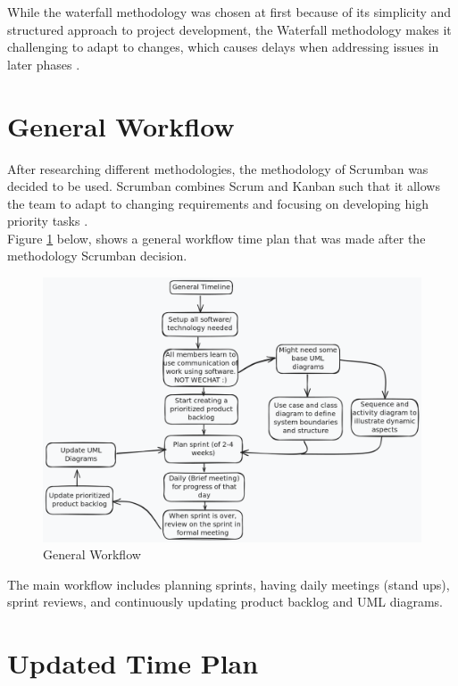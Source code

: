 \documentclass[a4paper,12pt, oneside]{report}
\begin{document}
While the waterfall methodology was chosen at first because of its simplicity and structured approach to project development, the Waterfall methodology makes it challenging to adapt to changes, which causes delays when addressing issues in later phases \cite{royce1970}.

\section{General Workflow}
After researching different methodologies, the methodology of Scrumban was decided to be used. Scrumban combines Scrum and Kanban such that it allows the team to adapt to changing requirements and focusing on developing high priority tasks \cite{alqudah2018empirical}. \\
Figure \ref{fig:general-workflow} below, shows a general workflow time plan that was made after the methodology Scrumban decision.\\

\begin{figure}[H]
    \centering
    \includegraphics[width=\linewidth]{OtherImage/General_Workflow.png}
    \caption{General Workflow}
    \label{fig:general-workflow}
\end{figure}

The main workflow includes planning sprints, having daily meetings (stand ups), sprint reviews, and continuously updating product backlog and UML diagrams.\\

\newpage

\section{Updated Time Plan}
\end{document}
